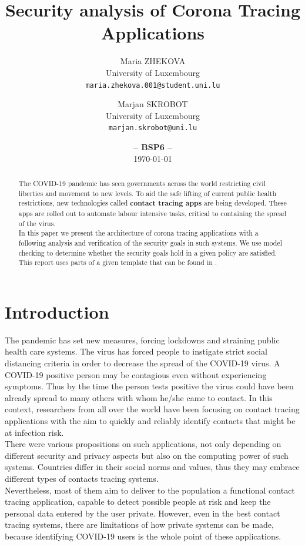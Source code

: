 \documentclass[a4paper, twocolumn]{article}
\title{\textbf{Security analysis of Corona Tracing Applications}}
\date{\textbf{-- BSP6 --}\\ \today}
\author{
    Maria ZHEKOVA\\
    \small University of Luxembourg\\
    \small\texttt{maria.zhekova.001@student.uni.lu}
	\and
    Marjan SKROBOT\\
    \small University of Luxembourg\\
	\small\texttt{marjan.skrobot@uni.lu}
}
\begin{document}
\maketitle

\begin{abstract}
    \noindent The COVID-19 pandemic has seen governments across the world restricting civil liberties and movement to new levels. To aid the safe lifting of current public health restrictions, new technologies called \textbf{contact tracing apps} are being developed. These apps are rolled out to automate labour intensive tasks, critical to containing the spread of the virus. \\
    In this paper we present the architecture of corona tracing applications with a following analysis and verification of the security goals in such systems. We use model checking to determine whether the security goals hold in a given policy are satisfied. This report uses parts of a given template that can be found in \cite{template}.
\end{abstract}

\section{Introduction}
The pandemic has set new measures, forcing lockdowns and straining public health care systems. The virus has forced people to instigate strict social distancing criteria in order to decrease the spread of the COVID-19 virus. A COVID-19 positive person may be contagious even without experiencing symptoms. Thus by the time the person tests positive the virus could have been already spread to many others with whom he/she came to contact. In this context, researchers from all over the world have been focusing on contact tracing applications with the aim to quickly and reliably identify contacts that might be at infection risk.\\
There were various propositions on such applications, not only depending on different security and privacy aspects but also on the computing power of such systems. Countries differ in their social norms and values, thus they may embrace different types of contacts tracing systems.\\
Nevertheless, most of them aim to deliver to the population a functional contact tracing application, capable to detect possible people at risk and keep the personal data entered by the user private. However, even in the best contact tracing systems, there are limitations of how private systems can be made, because identifying COVID-19 users is the whole point of these applications.
\end{document}
